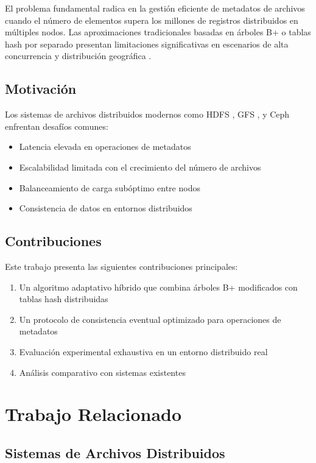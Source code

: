 \documentclass[conference]{IEEEtran}
\begin{document}
El problema fundamental radica en la gestión eficiente de metadatos de archivos cuando el número de elementos supera los millones de registros distribuidos en múltiples nodos. Las aproximaciones tradicionales basadas en árboles B+ o tablas hash por separado presentan limitaciones significativas en escenarios de alta concurrencia y distribución geográfica \cite{ghemawat2003google}.

\subsection{Motivación}

Los sistemas de archivos distribuidos modernos como HDFS \cite{shvachko2010hadoop}, GFS \cite{ghemawat2003google}, y Ceph \cite{weil2006ceph} enfrentan desafíos comunes:

\begin{itemize}
\item Latencia elevada en operaciones de metadatos
\item Escalabilidad limitada con el crecimiento del número de archivos
\item Balanceamiento de carga subóptimo entre nodos
\item Consistencia de datos en entornos distribuidos
\end{itemize}

\subsection{Contribuciones}

Este trabajo presenta las siguientes contribuciones principales:

\begin{enumerate}
\item Un algoritmo adaptativo híbrido que combina árboles B+ modificados con tablas hash distribuidas
\item Un protocolo de consistencia eventual optimizado para operaciones de metadatos
\item Evaluación experimental exhaustiva en un entorno distribuido real
\item Análisis comparativo con sistemas existentes
\end{enumerate}

\section{Trabajo Relacionado}

\subsection{Sistemas de Archivos Distribuidos}
\end{document}
